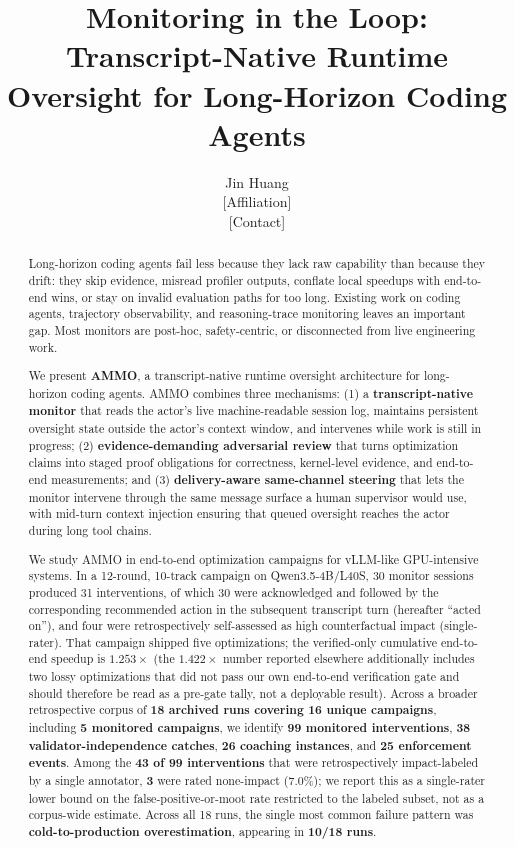 \documentclass[11pt]{article}
\title{\textbf{Monitoring in the Loop:\\ Transcript-Native Runtime Oversight for Long-Horizon Coding Agents}}
\author{Jin Huang\\ \small{[Affiliation]}\\ \small{[Contact]}}
\date{}
\begin{document}
\maketitle

\begin{abstract}
Long-horizon coding agents fail less because they lack raw capability than because they drift: they skip evidence, misread profiler outputs, conflate local speedups with end-to-end wins, or stay on invalid evaluation paths for too long. Existing work on coding agents, trajectory observability, and reasoning-trace monitoring leaves an important gap. Most monitors are post-hoc, safety-centric, or disconnected from live engineering work.

We present \textbf{AMMO}, a transcript-native runtime oversight architecture for long-horizon coding agents. AMMO combines three mechanisms: (1) a \textbf{transcript-native monitor} that reads the actor's live machine-readable session log, maintains persistent oversight state outside the actor's context window, and intervenes while work is still in progress; (2) \textbf{evidence-demanding adversarial review} that turns optimization claims into staged proof obligations for correctness, kernel-level evidence, and end-to-end measurements; and (3) \textbf{delivery-aware same-channel steering} that lets the monitor intervene through the same message surface a human supervisor would use, with mid-turn context injection ensuring that queued oversight reaches the actor during long tool chains.

We study AMMO in end-to-end optimization campaigns for vLLM-like GPU-intensive systems. In a 12-round, 10-track campaign on Qwen3.5-4B/L40S, 30 monitor sessions produced 31 interventions, of which 30 were acknowledged and followed by the corresponding recommended action in the subsequent transcript turn (hereafter ``acted on''), and four were retrospectively self-assessed as high counterfactual impact (single-rater). That campaign shipped five optimizations; the verified-only cumulative end-to-end speedup is \textbf{$1.253\times$} (the \textbf{$1.422\times$} number reported elsewhere additionally includes two lossy optimizations that did not pass our own end-to-end verification gate and should therefore be read as a pre-gate tally, not a deployable result). Across a broader retrospective corpus of \textbf{18 archived runs covering 16 unique campaigns}, including \textbf{5 monitored campaigns}, we identify \textbf{99 monitored interventions}, \textbf{38 validator-independence catches}, \textbf{26 coaching instances}, and \textbf{25 enforcement events}. Among the \textbf{43 of 99 interventions} that were retrospectively impact-labeled by a single annotator, \textbf{3} were rated none-impact (7.0\%); we report this as a single-rater lower bound on the false-positive-or-moot rate restricted to the labeled subset, not as a corpus-wide estimate. Across all 18 runs, the single most common failure pattern was \textbf{cold-to-production overestimation}, appearing in \textbf{10/18 runs}.


\end{abstract}
\end{document}
